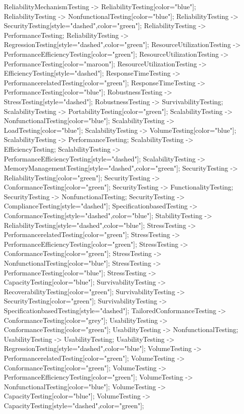 \documentclass{article}
\begin{document}
{ReliabilityMechanismTesting -> ReliabilityTesting[color="blue"];
ReliabilityTesting -> NonfunctionalTesting[color="blue"];
ReliabilityTesting -> SecurityTesting[style="dashed",color="green"];
ReliabilityTesting -> PerformanceTesting;
ReliabilityTesting -> RegressionTesting[style="dashed",color="green"];
ResourceUtilizationTesting -> PerformanceEfficiencyTesting[color="green"];
ResourceUtilizationTesting -> PerformanceTesting[color="maroon"];
ResourceUtilizationTesting -> EfficiencyTesting[style="dashed"];
ResponseTimeTesting -> PerformancerelatedTesting[color="green"];
ResponseTimeTesting -> PerformanceTesting[color="blue"];
RobustnessTesting -> StressTesting[style="dashed"];
RobustnessTesting -> SurvivabilityTesting;
ScalabilityTesting -> PortabilityTesting[color="green"];
ScalabilityTesting -> NonfunctionalTesting[color="blue"];
ScalabilityTesting -> LoadTesting[color="blue"];
ScalabilityTesting -> VolumeTesting[color="blue"];
ScalabilityTesting -> PerformanceTesting;
ScalabilityTesting -> EfficiencyTesting;
ScalabilityTesting -> PerformanceEfficiencyTesting[style="dashed"];
ScalabilityTesting -> MemoryManagementTesting[style="dashed",color="green"];
SecurityTesting -> ReliabilityTesting[color="green"];
SecurityTesting -> ConformanceTesting[color="green"];
SecurityTesting -> FunctionalityTesting;
SecurityTesting -> NonfunctionalTesting;
SecurityTesting -> ComplianceTesting[style="dashed"];
SpecificationbasedTesting -> ConformanceTesting[style="dashed",color="blue"];
StabilityTesting -> ReliabilityTesting[style="dashed",color="blue"];
StressTesting -> PerformancerelatedTesting[color="green"];
StressTesting -> PerformanceEfficiencyTesting[color="green"];
StressTesting -> ConformanceTesting[color="green"];
StressTesting -> NonfunctionalTesting[color="blue"];
StressTesting -> PerformanceTesting[color="blue"];
StressTesting -> CapacityTesting[color="blue"];
SurvivabilityTesting -> RecoverabilityTesting[color="green"];
SurvivabilityTesting -> SecurityTesting[color="green"];
SurvivabilityTesting -> SpecificationbasedTesting[style="dashed"];
TailoredConformanceTesting -> ConformanceTesting[color="grey"];
UsabilityTesting -> ConformanceTesting[color="green"];
UsabilityTesting -> NonfunctionalTesting;
UsabilityTesting -> UsabilityTesting;
UsabilityTesting -> RegressionTesting[style="dashed",color="blue"];
VolumeTesting -> PerformancerelatedTesting[color="green"];
VolumeTesting -> ConformanceTesting[color="green"];
VolumeTesting -> PerformanceEfficiencyTesting[color="green"];
VolumeTesting -> NonfunctionalTesting[color="blue"];
VolumeTesting -> CapacityTesting[color="blue"];
VolumeTesting -> CapacityTesting[style="dashed",color="green"];

}
\end{document}
